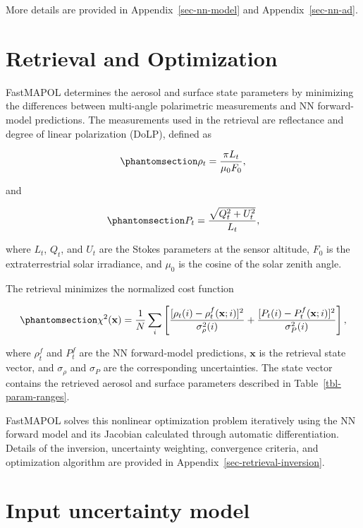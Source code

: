 \documentclass[
  11pt,
  letterpaper,
]{scrreprt}
\begin{document}
More details are provided in Appendix~\ref{sec-nn-model} and
Appendix~\ref{sec-nn-ad}.

\section{Retrieval and Optimization}\label{retrieval-and-optimization}

FastMAPOL determines the aerosol and surface state parameters by
minimizing the differences between multi-angle polarimetric measurements
and NN forward-model predictions. The measurements used in the retrieval
are reflectance and degree of linear polarization (DoLP), defined as

\begin{equation}\phantomsection\label{eq-rho}{
\rho_t
=
\frac{\pi L_t}{\mu_0 F_0},
}\end{equation}

and

\begin{equation}\phantomsection\label{eq-DoLP}{
P_t
=
\frac{\sqrt{Q_t^2+U_t^2}}{L_t},
}\end{equation}

where \(L_t\), \(Q_t\), and \(U_t\) are the Stokes parameters at the
sensor altitude, \(F_0\) is the extraterrestrial solar irradiance, and
\(\mu_0\) is the cosine of the solar zenith angle.

The retrieval minimizes the normalized cost function

\begin{equation}\phantomsection\label{eq-cost}{
\chi^2({\mathbf x})
=
\frac{1}{N}
\sum_i
\left[
\frac{[\rho_t(i)-\rho_t^f({\mathbf x};i)]^2}{\sigma_\rho^2(i)}
+
\frac{[P_t(i)-P_t^f({\mathbf x};i)]^2}{\sigma_P^2(i)}
\right],
}\end{equation}

where \(\rho_t^f\) and \(P_t^f\) are the NN forward-model predictions,
\({\mathbf x}\) is the retrieval state vector, and \(\sigma_\rho\) and
\(\sigma_P\) are the corresponding uncertainties. The state vector
contains the retrieved aerosol and surface parameters described in
Table~\ref{tbl-param-ranges}.

FastMAPOL solves this nonlinear optimization problem iteratively using
the NN forward model and its Jacobian calculated through automatic
differentiation. Details of the inversion, uncertainty weighting,
convergence criteria, and optimization algorithm are provided in
Appendix~\ref{sec-retrieval-inversion}.

\section{Input uncertainty model}\label{input-uncertainty-model}
\end{document}
